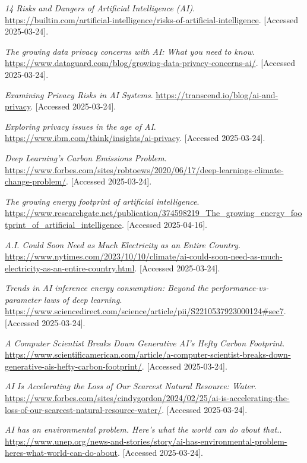 \documentclass[licencjacka,en]{pracamgr}
\begin{document}
\begin{thebibliography}{199}
\textit{ 14 Risks and Dangers of Artificial Intelligence (AI)}.
\url{https://builtin.com/artificial-intelligence/risks-of-artificial-intelligence}.
[Accessed 2025-03-24].

\textit{The growing data privacy concerns with AI: What you need to know}.
\url{https://www.dataguard.com/blog/growing-data-privacy-concerns-ai/}.
[Accessed 2025-03-24].

\textit{Examining Privacy Risks in AI Systems}.
\url{https://transcend.io/blog/ai-and-privacy}.
[Accessed 2025-03-24].

\textit{Exploring privacy issues in the age of AI}.
\url{https://www.ibm.com/think/insights/ai-privacy}.
[Accessed 2025-03-24].


\textit{Deep Learning’s Carbon Emissions Problem}.
\url{https://www.forbes.com/sites/robtoews/2020/06/17/deep-learnings-climate-change-problem/}.
[Accessed 2025-03-24].

\textit{The growing energy footprint of artificial intelligence}.
\url{https://www.researchgate.net/publication/374598219_The_growing_energy_footprint_of_artificial_intelligence}.
[Accessed 2025-04-16].

\textit{A.I. Could Soon Need as Much Electricity as an Entire Country}.
\url{https://www.nytimes.com/2023/10/10/climate/ai-could-soon-need-as-much-electricity-as-an-entire-country.html}.
[Accessed 2025-03-24].

\textit{Trends in AI inference energy consumption: Beyond the performance-vs-parameter laws of deep learning}.
\url{https://www.sciencedirect.com/science/article/pii/S2210537923000124#sec7}.
[Accessed 2025-03-24].

\textit{A Computer Scientist Breaks Down Generative AI’s Hefty Carbon Footprint}.
\url{https://www.scientificamerican.com/article/a-computer-scientist-breaks-down-generative-ais-hefty-carbon-footprint/}.
[Accessed 2025-03-24].

\textit{AI Is Accelerating the Loss of Our Scarcest Natural Resource: Water}.
\url{https://www.forbes.com/sites/cindygordon/2024/02/25/ai-is-accelerating-the-loss-of-our-scarcest-natural-resource-water/}.
[Accessed 2025-03-24].

\textit{AI has an environmental problem. Here’s what the world can do about that.}.
\url{https://www.unep.org/news-and-stories/story/ai-has-environmental-problem-heres-what-world-can-do-about}.
[Accessed 2025-03-24].


\end{thebibliography}
\end{document}
